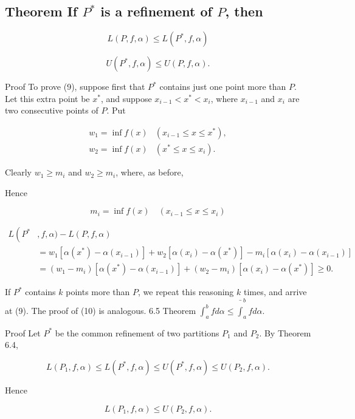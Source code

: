 \documentclass[10pt]{article}
\begin{document}
\subsection{Theorem If $P^{*}$ is a refinement of $P$, then}
$$
L(P, f, \alpha) \leq L\left(P^{*}, f, \alpha\right)
$$

$$
U\left(P^{*}, f, \alpha\right) \leq U(P, f, \alpha) .
$$

Proof To prove (9), suppose first that $P^{*}$ contains just one point more than $P$. Let this extra point be $x^{*}$, and suppose $x_{i-1}<x^{*}<x_{i}$, where $x_{i-1}$ and $x_{i}$ are two consecutive points of $P$. Put

$$
\begin{array}{ll}
w_{1}=\inf f(x) & \left(x_{i-1} \leq x \leq x^{*}\right), \\
w_{2}=\inf f(x) & \left(x^{*} \leq x \leq x_{i}\right) .
\end{array}
$$

Clearly $w_{1} \geq m_{i}$ and $w_{2} \geq m_{i}$, where, as before,

Hence

$$
m_{i}=\inf f(x) \quad\left(x_{i-1} \leq x \leq x_{i}\right)
$$

$$
\begin{aligned}
L\left(P^{*}\right. & , f, \alpha)-L(P, f, \alpha) \\
& =w_{1}\left[\alpha\left(x^{*}\right)-\alpha\left(x_{i-1}\right)\right]+w_{2}\left[\alpha\left(x_{i}\right)-\alpha\left(x^{*}\right)\right]-m_{i}\left[\alpha\left(x_{i}\right)-\alpha\left(x_{i-1}\right)\right] \\
& =\left(w_{1}-m_{i}\right)\left[\alpha\left(x^{*}\right)-\alpha\left(x_{i-1}\right)\right]+\left(w_{2}-m_{i}\right)\left[\alpha\left(x_{i}\right)-\alpha\left(x^{*}\right)\right] \geq 0 .
\end{aligned}
$$

If $P^{*}$ contains $k$ points more than $P$, we repeat this reasoning $k$ times, and arrive at (9). The proof of (10) is analogous. 6.5 Theorem $\int_{a}^{b} f d \alpha \leq \bar{\int}_{a}^{b} f d \alpha$.

Proof Let $P^{*}$ be the common refinement of two partitions $P_{1}$ and $P_{2}$. By Theorem 6.4,

$$
L\left(P_{1}, f, \alpha\right) \leq L\left(P^{*}, f, \alpha\right) \leq U\left(P^{*}, f, \alpha\right) \leq U\left(P_{2}, f, \alpha\right) .
$$

Hence

$$
L\left(P_{1}, f, \alpha\right) \leq U\left(P_{2}, f, \alpha\right) .
$$
\end{document}
